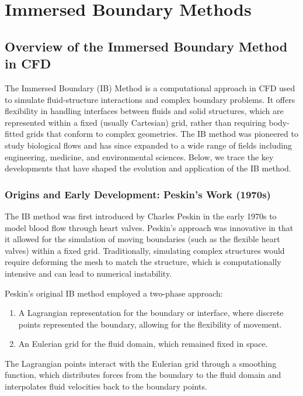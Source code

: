 \chapter{ Immersed Boundary Methods}

\section{Overview of the Immersed Boundary Method in CFD}
The Immersed Boundary (IB) Method is a computational approach in CFD used to
simulate fluid-structure interactions and complex boundary problems. It offers
flexibility in handling interfaces between fluids and solid structures, which
are represented within a fixed (usually Cartesian) grid, rather than requiring
body-fitted grids that conform to complex geometries. The IB method was
pioneered to study biological flows and has since expanded to a wide range of
fields including engineering, medicine, and environmental sciences. Below, we
trace the key developments that have shaped the evolution and application of the
IB method.

\subsection{Origins and Early Development: Peskin’s Work (1970s)}
The IB method was first introduced by Charles Peskin in the early 1970s to model
blood flow through heart valves. Peskin's approach was innovative in that it
allowed for the simulation of moving boundaries (such as the flexible heart
valves) within a fixed grid. Traditionally, simulating complex structures would
require deforming the mesh to match the structure, which is computationally
intensive and can lead to numerical instability.

Peskin's original IB method employed a two-phase approach:

\begin{enumerate}
    \item A Lagrangian representation for the boundary or interface, where
    discrete points represented the boundary, allowing for the flexibility of
    movement.
    \item An Eulerian grid for the fluid domain, which remained fixed in space.
\end{enumerate}

The Lagrangian points interact with the Eulerian grid through a smoothing
function, which distributes forces from the boundary to the fluid domain and
interpolates fluid velocities back to the boundary points.


